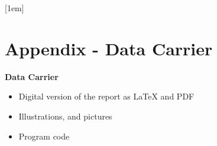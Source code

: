 \renewcommand{\chaptername}{Anhang}
\renewcommand{\theequation}{\Alph{chapter}.\arabic{equation}}
\renewcommand{\thetable}{\Alph{chapter}.\arabic{table}}
\renewcommand{\thefigure}{\Alph{chapter}.\arabic{figure}}


[1em]	%
{}	%
{\contentslabel{1em}}	%
{}
{\vzPunkte\contentspage} %



\chapter{Appendix - Data Carrier}


\textbf{Data Carrier}

\begin{itemize}
    \item Digital version of the report as LaTeX and PDF
    \item Illustrations, and  pictures
    \item Program code
\end{itemize}
  
  
 
  
 


